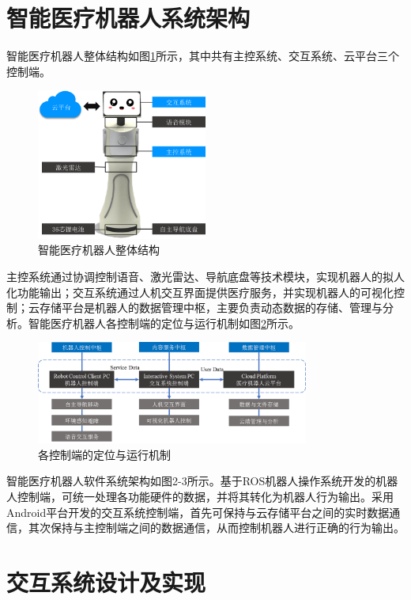 \documentclass[UTF8,bachelor]{XJTUthesis}
\begin{document}
\section{智能医疗机器人系统架构}
智能医疗机器人整体结构如图\ref{overall_struct}所示，其中共有主控系统、交互系统、云平台三个控制端。
\begin{figure}[htbp]
  \centering
  \includegraphics[width=0.5\textwidth]{example//overallstruct.png}
  \caption{智能医疗机器人整体结构}\label{overall_struct}
\end{figure}
主控系统通过协调控制语音、激光雷达、导航底盘等技术模块，实现机器人的拟人化功能输出；交互系统通过人机交互界面提供医疗服务，并实现机器人的可视化控制；云存储平台是机器人的数据管理中枢，主要负责动态数据的存储、管理与分析。智能医疗机器人各控制端的定位与运行机制如图\ref{flowchart}所示。\par
\begin{figure}[htbp]
  \centering
  \includegraphics[width=0.8\textwidth]{example//flowchart.png}
  \caption{各控制端的定位与运行机制}\label{flowchart}
\end{figure}
智能医疗机器人软件系统架构如图2-3所示。基于ROS机器人操作系统开发的机器人控制端，可统一处理各功能硬件的数据，并将其转化为机器人行为输出。采用Android平台开发的交互系统控制端，首先可保持与云存储平台之间的实时数据通信，其次保持与主控制端之间的数据通信，从而控制机器人进行正确的行为输出。

\section{交互系统设计及实现}
\end{document}
